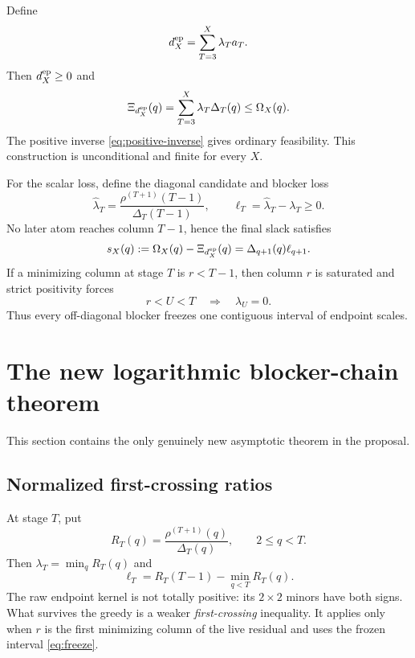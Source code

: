\documentclass[11pt]{article}
\newcommand{\Xirow}{\Xi}
\newcommand{\Om}{\Omega}
\begin{document}
Define
\begin{equation}
 d_X^{\rm ep}=\sum_{T=3}^X\lambda_Ta_T.
 \label{eq:compiled-row}
\end{equation}
Then $d_X^{\rm ep}\ge0$ and
\begin{equation}
 \Xirow_{d_X^{\rm ep}}(q)=\sum_{T=3}^X\lambda_T\Delta_T(q)\le\Om_X(q).
 \label{eq:compiled-feasible}
\end{equation}
The positive inverse \eqref{eq:positive-inverse} gives ordinary feasibility. This construction is unconditional and finite for every $X$.

For the scalar loss, define the diagonal candidate and blocker loss
\begin{equation}
 \widehat\lambda_T=\frac{\rho^{(T+1)}(T-1)}{\Delta_T(T-1)},
 \qquad
 \ell_T=\widehat\lambda_T-\lambda_T\ge0.
 \label{eq:blocker-loss}
\end{equation}
No later atom reaches column $T-1$, hence the final slack satisfies
\begin{equation}
 s_X(q):=\Om_X(q)-\Xirow_{d_X^{\rm ep}}(q)
 =\Delta_{q+1}(q)\ell_{q+1}.
 \label{eq:slack-blocker}
\end{equation}
If a minimizing column at stage $T$ is $r<T-1$, then column $r$ is saturated and strict positivity forces
\begin{equation}
 r<U<T\quad\Longrightarrow\quad\lambda_U=0.
 \label{eq:freeze}
\end{equation}
Thus every off-diagonal blocker freezes one contiguous interval of endpoint scales.

\section{The new logarithmic blocker-chain theorem}

This section contains the only genuinely new asymptotic theorem in the proposal.

\subsection{Normalized first-crossing ratios}

At stage $T$, put
\begin{equation}
 R_T(q)=\frac{\rho^{(T+1)}(q)}{\Delta_T(q)},\qquad 2\le q<T.
 \label{eq:ratio}
\end{equation}
Then $\lambda_T=\min_qR_T(q)$ and
\begin{equation}
 \ell_T=R_T(T-1)-\min_{q<T}R_T(q).
 \label{eq:ell-ratio}
\end{equation}
The raw endpoint kernel is not totally positive: its $2\times2$ minors have both signs. What survives the greedy is a weaker \emph{first-crossing} inequality. It applies only when $r$ is the first minimizing column of the live residual and uses the frozen interval \eqref{eq:freeze}.
\end{document}
